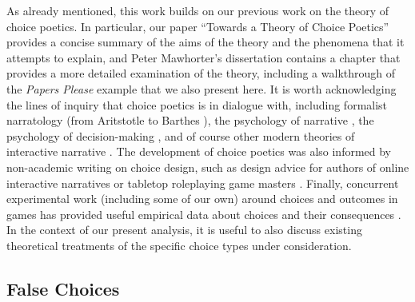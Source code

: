 \documentclass[arts,article,submit,moreauthors,pdftex,10pt,a4paper]{Definitions/mdpi}
\begin{document}
As already mentioned, this work builds on our previous work on the theory of choice poetics.
%
In particular, our paper ``Towards a Theory of Choice Poetics'' \citep{mawhorter2014towards} provides a concise summary of the aims of the theory and the phenomena that it attempts to explain, and Peter Mawhorter's dissertation \citeyear{mawhorter2016artificial} contains a chapter that provides a more detailed examination of the theory, including a walkthrough of the \emph{Papers Please} example that we also present here.
%
It is worth acknowledging the lines of inquiry that choice poetics is in dialogue with, including formalist narratology (from Aritstotle \citeyear{aristotle1917poetics} to Barthes \citeyear{barthes1975introduction}), the psychology of narrative \citep{tversky1981framing,green2000role,mar2008function,zunshine2006why}, the psychology of decision-making \citep{mellers1997decision,schwartz2002maximizing}, and of course other modern theories of interactive narrative \citep{aarseth1997cybertext,murray1997hamlet,tosca2000pragmatics,mateas2001preliminary,frasca2003ludologists,lindley2005story}.
%
The development of choice poetics was also informed by non-academic writing on choice design, such as design advice for authors of online interactive narratives \citep{choiceofgames2010rules} or tabletop roleplaying game masters \citep{laws2001robin}.
%
Finally, concurrent experimental work (including some of our own) around choices and outcomes in games has provided useful empirical data about choices and their consequences \citep{fendt2012achieving,cardonarivera2014foreseeing,mawhorter2015generating,iten2018choosing}.
%
In the context of our present analysis, it is useful to also discuss existing theoretical treatments of the specific choice types under consideration.

\subsection{False Choices}
\end{document}
